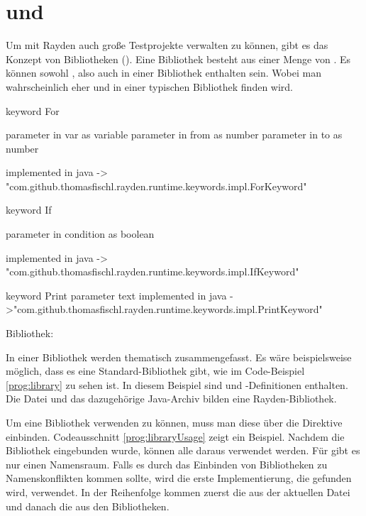 \section{ und }

Um mit Rayden auch große Testprojekte verwalten zu können, gibt es das Konzept von Bibliotheken (). Eine Bibliothek besteht aus einer Menge von . Es können sowohl ,  also auch  in einer Bibliothek enthalten sein. Wobei man wahrscheinlich eher  und  in einer typischen Bibliothek finden wird.  

\begin{program}
\begin{JavaCode}
keyword For { 
	parameter in var as variable
	parameter in from as number
	parameter in to as number

	implemented in java -> "com.github.thomasfischl.rayden.runtime.keywords.impl.ForKeyword"
}

keyword If { 
	parameter in condition as boolean

	implemented in java -> "com.github.thomasfischl.rayden.runtime.keywords.impl.IfKeyword"
}

keyword Print {
	parameter text
	implemented in java ->"com.github.thomasfischl.rayden.runtime.keywords.impl.PrintKeyword"
}
\end{JavaCode}
\caption{Bibliothek: }
\label{prog:library}
\end{program}

\SuperPar
In einer Bibliothek werden  thematisch zusammengefasst. Es wäre beispielsweise möglich, dass es eine Standard-Bibliothek gibt, wie im Code-Beispiel \ref{prog:library} zu sehen ist. In diesem Beispiel sind  und -Definitionen enthalten. Die Datei  und das dazugehörige Java-Archiv bilden eine Rayden-Bibliothek. 

\SuperPar
Um eine Bibliothek verwenden zu können, muss man diese über die Direktive  einbinden. Codeausschnitt \ref{prog:libraryUsage} zeigt ein Beispiel. Nachdem die Bibliothek eingebunden wurde, können alle  daraus verwendet werden. Für  gibt es nur einen Namensraum. Falls es durch das Einbinden von Bibliotheken zu Namenskonflikten kommen sollte, wird die erste Implementierung, die gefunden wird, verwendet. In der Reihenfolge kommen zuerst die  aus der aktuellen Datei und danach die  aus den Bibliotheken.


